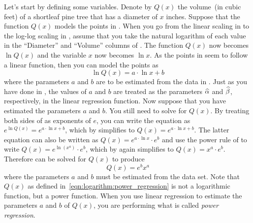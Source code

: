 \documentclass[a4paper,oneside,12pt]{article}
\begin{document}
Let's start by defining some variables.  Denote by $Q(x)$ the
volume~(in cubic feet) of a shortleaf pine tree that has a diameter of
$x$ inches.  Suppose that the function $Q(x)$ models the points in
.  When you go from the linear
scaling in  to the log-log
scaling in , assume that you take
the natural logarithm of each value in the ``Diameter'' and ``Volume''
columns of .  The function $Q(x)$ now
becomes $\ln Q(x)$ and the variable $x$ now becomes $\ln x$.  As the
points in  seem to follow a linear
function, then you can model the points as
\begin{equation}
\label{eqn:logarithm:log_log_regression}
\ln Q(x)
=
a \cdot \ln x + b
\end{equation}
where the parameters $a$ and $b$ are to be estimated from the data in
.  Just as you have done
in ,
the values of $a$ and $b$ are treated as the parameters $\widehat{\alpha}$
and $\widehat{\beta}$, respectively, in the linear regression function.  Now
suppose that you have estimated the parameters $a$ and $b$.  You still
need to solve  for $Q(x)$.
By treating both sides of 
as exponents of $e$, you can write the equation as
$e^{\ln Q(x)} = e^{a \cdot \ln x + b}$, which by
simplifies to $Q(x) = e^{a \cdot \ln x + b}$.  The latter equation can
also be written as $Q(x) = e^{a \cdot \ln x} \cdot e^b$ and use the
power rule of
to write $Q(x) = e^{\ln(x^a)} \cdot e^b$, which by
again simplifies to $Q(x) = x^a \cdot e^b$.  Therefore
 can be solved for $Q(x)$
to produce
\begin{equation}
\label{eqn:logarithm:power_regression}
Q(x)
=
e^b x^a
\end{equation}
where the parameters $a$ and $b$ must be estimated from the data set.
Note that $Q(x)$ as defined in~\eqref{eqn:logarithm:power_regression}
is not a logarithmic function, but a power function.  When you use
linear regression to estimate the parameters $a$ and $b$ of $Q(x)$,
you are performing what is called \emph{power regression}.
\end{document}
